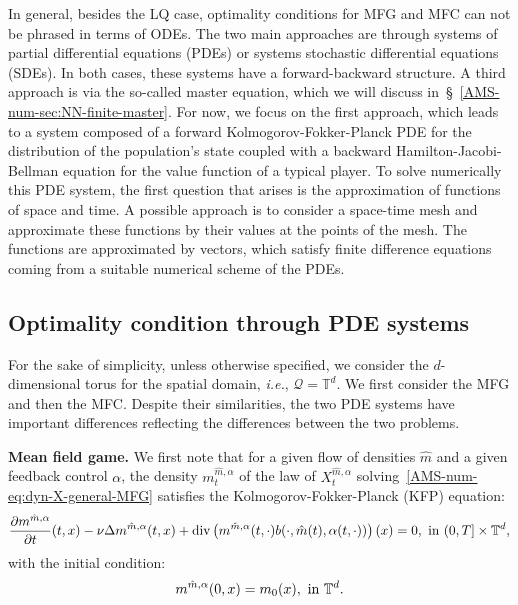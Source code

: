 \documentclass{amsproc}
\theoremstyle{definition}
\theoremstyle{remark}
\numberwithin{equation}{section}
\newcommand{\TT}{{\mathbb T}}
\newcommand{\ctrl}{\alpha}
\newcommand{\dom}{\mathcal{Q}}
\newcommand{\diver}{\mathrm{div}}
\begin{document}
In general, besides the LQ case, optimality conditions for MFG and MFC can not be phrased in terms of ODEs. The two main approaches are through systems of partial differential equations (PDEs) or systems stochastic differential equations (SDEs). In both cases, these systems have a forward-backward structure. A third approach is via the so-called master equation, which we will discuss in~\S~\ref{AMS-num-sec:NN-finite-master}. For now, we focus on the first approach, which leads to a system composed of a forward Kolmogorov-Fokker-Planck PDE for the distribution of the population's state coupled with a backward Hamilton-Jacobi-Bellman equation for the value function of a typical player. To solve numerically this PDE system, the first question that arises is the approximation of functions of space and time. A possible approach is to consider a space-time mesh and approximate these functions by their values at the points of the mesh. The functions are approximated by vectors, which satisfy finite difference equations coming from a suitable numerical scheme of the PDEs.






\subsection{Optimality condition through PDE systems}
\label{AMS-num-sec:PDEsystem}

For the sake of simplicity, unless otherwise specified, we consider the $d$-dimensional torus for the spatial domain, \textit{i.e.}, $\dom = \TT^d$. We first consider the MFG and then the MFC. Despite their similarities, the two PDE systems have important differences reflecting the differences between the two problems. 




\textbf{Mean field game.} We first note that for a given flow of densities $\hat{m}$ and a given feedback control $\ctrl$, the density $m^{\hat{m}, \ctrl}_t$ of the law of $X^{\hat{m}, \ctrl}_t$ solving~\eqref{AMS-num-eq:dyn-X-general-MFG} satisfies the Kolmogorov-Fokker-Planck (KFP) equation:
\begin{equation}
\label{AMS-num-eq:KFP-ctrl}
	\frac{\partial m^{\hat{m}, \ctrl}}{\partial t}(t,x)  - \nu \Delta m^{\hat{m}, \ctrl}(t,x) + \diver\left( m^{\hat{m}, \ctrl}(t,\cdot) b(\cdot, \hat m(t), \ctrl(t,\cdot)) \right)(x) = 0, 
	\hbox{ in } (0,T] \times \TT^d ,
\end{equation}
with the initial condition:
\begin{equation}
\label{AMS-num-eq:KFP-ctrl-init}
	m^{\hat{m}, \ctrl}(0,x) = m_0(x), 
	\hbox{ in } \TT^d.
\end{equation}
\end{document}
